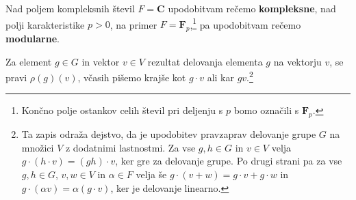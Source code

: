 \documentclass[11pt]{book}
\def\CC{\mathbf{C}}
\def\FF{\mathbf{F}}
\def\definicija{\color{rdeca}\bf}
\theoremstyle{definition}
\theoremstyle{zgled}
\theoremstyle{zgledbrezstevilke}
\theoremstyle{odprtproblem}
\theoremstyle{domacanaloga}
\theoremstyle{izrek}
\begin{document}
Nad poljem kompleksnih števil $F = \CC$ upodobitvam rečemo {\definicija kompleksne}, nad polji karakteristike $p > 0$, na primer $F = \FF_p$,\footnote{Končno polje ostankov celih števil pri deljenju s $p$ bomo označili s $\FF_p$.} pa upodobitvam rečemo {\definicija modularne}. 

Za element $g \in G$ in vektor $v \in V$ rezultat delovanja elementa $g$ na vektorju $v$, se pravi $\rho(g)(v)$, včasih pišemo krajše kot $g \cdot v$ ali kar $gv$.\footnote{Ta zapis odraža dejstvo, da je upodobitev pravzaprav delovanje grupe $G$ na množici $V$ z dodatnimi lastnostmi. Za vse $g, h \in G$ in $v \in V$ velja $g \cdot (h \cdot v) = (gh) \cdot v$, ker gre za delovanje grupe. Po drugi strani pa za vse $g,h \in G$, $v,w \in V$ in $\alpha \in F$ velja še $g \cdot (v + w) = g \cdot v + g \cdot w$ in $g \cdot (\alpha v) = \alpha (g \cdot v)$, ker je delovanje linearno.}
\end{document}
